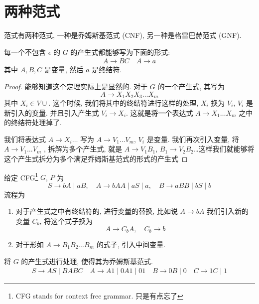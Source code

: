 \documentclass[../main.tex]{subfiles}
\begin{document}
\section{两种范式}
\label{sec:两种范式}
范式有两种范式, 一种是乔姆斯基范式 (CNF), 另一种是格雷巴赫范式 (GNF). 

\begin{definition}[CNF]
\label{def:CNF}
每一个不包含 \(\epsilon\) 的 \(G\) 的产生式都能够写为下面的形式: 
\[
	\begin{aligned}
	A  \to BC  \quad A \to a 
	\end{aligned}
\]
其中 \(A,  B , C \) 是变量, 然后 \(a\) 是终结符. 
\end{definition}

\begin{proof}
能够知道这个定理实际上是显然的. 对于 \(G\) 的一个产生式, 其写为 
\[
A \to X_1 X_2 X_3 \dots X_m 
\]
	其中 \(X _{i} \in V \cup\). 这个时候, 我们将其中的终结符进行这样的处理, \(X_{i}\) 换为 \(V_{i}\), \(V_{i}\) 是新引入的变量. 
	并且引入产生式 \(V_{i} \to X _{i}\). 这就是将一个表达式 \(A \to X_1 \dots X_{m}\) 之中的终结符处理掉了. 
	
	我们将表达式 \(A \to X _{i}\dots\) 写为 \(A \to V_1 \dots V_{m}\), \(V_{i}\) 是变量. 我们再次引入变量, 将 \(A \to V_1\dots V_{m}\) , 拆解为多个产生式, 就是 \(A \to V_1 B_1\), \(B_1 \to V_2 B_2\)\dots 这样我们就能够将这个产生式拆分为多个满足乔姆斯基范式的形式的产生式
\end{proof}

\begin{exam}
给定 CFG\footnote{CFG stands for context free grammar. 只是有点忘了} \(G\), \(P\) 为 
\[
S \to b A \mid a B , \quad A \to b A  A \mid a S \mid a, \quad B \to a BB \mid bS \mid b 
\]
流程为
\begin{enumerate}
\item 对于产生式之中有终结符的, 进行变量的替换, 比如说 \(A \to b A\) 我们引入新的变量 \(C_{b}\), 将这个式子换为 
	\[
	A \to C_{b} A , \quad  C_{b} \to b
	\]
\item 对于形如 \(A\to  B_1 B_2 \dots B _{m}\) 的式子, 引入中间变量. 
\end{enumerate}
\end{exam}

\begin{exam}
	将 \(G\) 的产生式进行处理, 使得其为乔姆斯基范式. 
	\[
	\begin{aligned}
	S \to A S \mid B A B C \quad A \to A 1 \mid 0 A 1 \mid 01 \quad B \to 0 B \mid 0 \quad C \to 1 C \mid 1
	\end{aligned}
	\]
\end{exam}
\end{document}
